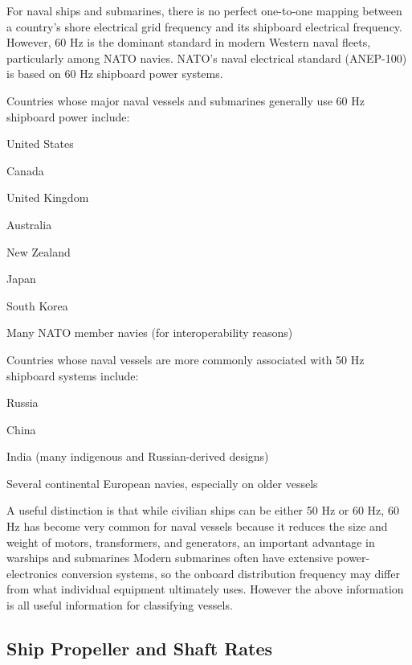 For naval ships and submarines, there is no perfect one-to-one mapping between a country's shore electrical grid frequency and its shipboard electrical frequency. However, 60 Hz is the dominant standard in modern Western naval fleets, particularly among NATO navies. NATO's naval electrical standard (ANEP-100) is based on 60 Hz shipboard power systems.

Countries whose major naval vessels and submarines generally use 60 Hz shipboard power include:

\begin{compactitem}
    \item United States
    \item Canada
    \item United Kingdom
    \item Australia
    \item New Zealand
    \item Japan
    \item South Korea
    \item Many NATO member navies (for interoperability reasons)
\end{compactitem}

Countries whose naval vessels are more commonly associated with 50 Hz shipboard systems include:

\begin{compactitem}
    \item Russia
    \item China
    \item India (many indigenous and Russian-derived designs)
    \item Several continental European navies, especially on older vessels
\end{compactitem}

A useful distinction is that while civilian ships can be either 50 Hz or 60 Hz, 60 Hz has become very common for naval vessels because it reduces the size and weight of motors, transformers, and generators, an important advantage in warships and submarines Modern submarines often have extensive power-electronics conversion systems, so the onboard distribution frequency may differ from what individual equipment ultimately uses. However the above information is all useful information for classifying vessels.

\subsection{Ship Propeller and Shaft Rates}

